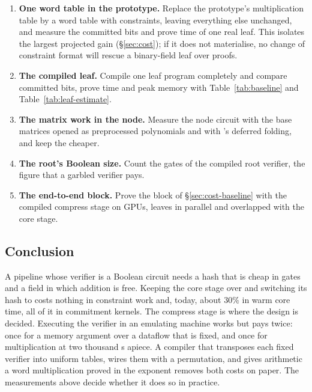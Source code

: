 \begin{enumerate}
  \item \textbf{One word table in the prototype.} Replace the prototype's \KB{} multiplication table by a word table with \MUL{} constraints, leaving everything else unchanged, and measure the committed bits and prove time of one real leaf. This isolates the largest projected gain (\S\ref{sec:cost}); if it does not materialise, no change of constraint format will rescue a binary-field leaf over \KB{} proofs.
  \item \textbf{The compiled leaf.} Compile one leaf program completely and compare committed bits, prove time and peak memory with Table~\ref{tab:baseline} and Table~\ref{tab:leaf-estimate}.
  \item \textbf{The matrix work in the node.} Measure the node circuit with the base matrices opened as preprocessed polynomials and with \Flock{}'s deferred folding, and keep the cheaper.
  \item \textbf{The root's Boolean size.} Count the \AND{} gates of the compiled root verifier, the figure that a garbled verifier pays.
  \item \textbf{The end-to-end block.} Prove the block of \S\ref{sec:cost-baseline} with the compiled compress stage on GPUs, leaves in parallel and overlapped with the core stage.
\end{enumerate}

\subsection{Conclusion}

A pipeline whose verifier is a Boolean circuit needs a hash that is cheap in \AND{} gates and a field in which addition is free. Keeping the core stage over \KB{} and switching its hash to \Blake{} costs nothing in constraint work and, today, about $30\%$ in warm core time, all of it in commitment kernels. The compress stage is where the design is decided. Executing the verifier in an emulating machine works but pays twice: once for a memory argument over a dataflow that is fixed, and once for \KB{} multiplication at two thousand \AND{}s apiece. A compiler that transposes each fixed verifier into uniform tables, wires them with a permutation, and gives \KB{} arithmetic a word multiplication proved in the exponent removes both costs on paper. The measurements above decide whether it does so in practice.
